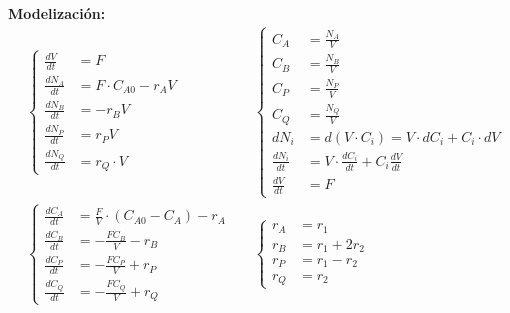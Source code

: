 \begin{enumerate}[label=\Roman*.]
	      \textbf{Modelización:}
	      \begin{align*}
		       & \left\{
		      \begin{aligned}
			      \frac{dV}{dt}   & = F                      \\[6pt]
			      \frac{dN_A}{dt} & = F \cdot C_{A0} - r_A V \\[6pt]
			      \frac{dN_B}{dt} & = - r_B V                \\[6pt]
			      \frac{dN_P}{dt} & = r_P V                  \\[6pt]
			      \frac{dN_Q}{dt} & = r_Q \cdot V
		      \end{aligned}
		      \right.
		       &         &
		      \left\{
		      \begin{aligned}
			      C_A             & = \frac{N_A}{V}                                \\[6pt]
			      C_B             & = \frac{N_B}{V}                                \\[6pt]
			      C_P             & = \frac{N_P}{V}                                \\[6pt]
			      C_Q             & = \frac{N_Q}{V}                                \\[6pt]
			      dN_i            & = d(V \cdot C_i) = V \cdot dC_i + C_i \cdot dV \\[6pt]
			      \frac{dN_i}{dt} & = V \cdot \frac{dC_i}{dt} + C_i \frac{dV}{dt}  \\[6pt]
			      \frac{dV}{dt}   & = F
		      \end{aligned}
		      \right.
		      \\[1.5em]
		       & \left\{
		      \begin{aligned}
			      \frac{dC_A}{dt} & = \frac{F}{V}\cdot (C_{A0}-C_A) - r_A \\[6pt]
			      \frac{dC_B}{dt} & = -\frac{F C_B}{V} - r_B              \\[6pt]
			      \frac{dC_P}{dt} & = -\frac{F C_P}{V} + r_P              \\[6pt]
			      \frac{dC_Q}{dt} & = -\frac{F C_Q}{V} + r_Q
		      \end{aligned}
		      \right.
		       &         &
		      \left\{
		      \begin{aligned}
			      r_A & = r_1         \\[6pt]
			      r_B & = r_1 + 2 r_2 \\[6pt]
			      r_P & = r_1 - r_2   \\[6pt]
			      r_Q & = r_2
		      \end{aligned}

\end{align*}
\end{enumerate}
